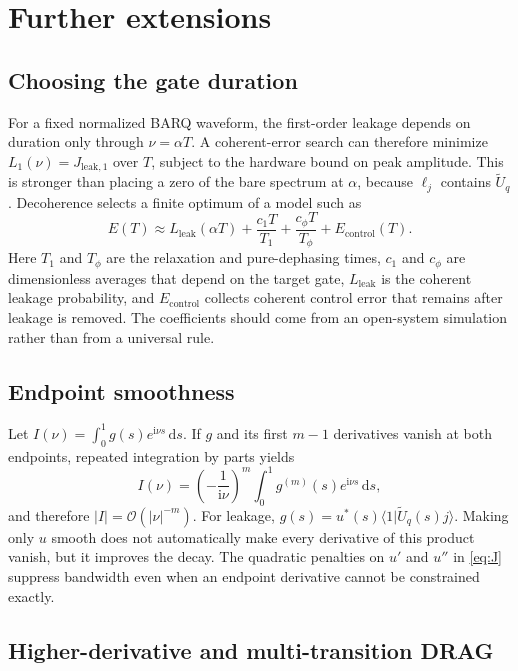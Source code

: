 \documentclass[11pt,a4paper]{article}
\theoremstyle{definition}
\newcommand{\braket}[2]{\langle #1\vert #2\rangle}
\newcommand{\abs}[1]{\lvert #1\rvert}
\newcommand{\dd}{\mathrm{d}}
\newcommand{\ii}{\mathrm{i}}
\newcommand{\order}{\mathcal{O}}
\begin{document}
\section{Further extensions}

\subsection{Choosing the gate duration}

For a fixed normalized BARQ waveform, the first-order leakage depends on
duration only through \(\nu=\alpha T\).  A coherent-error search can therefore
minimize \(L_1(\nu)=J_{\mathrm{leak},1}\) over \(T\), subject to the hardware
bound on peak amplitude.  This is stronger than placing a zero of the bare
spectrum at \(\alpha\), because \(\ell_j\) contains \(\tilde U_q\).  Decoherence
selects a finite optimum of a model such as
\begin{equation}
  E(T)\approx L_{\mathrm{leak}}(\alpha T)+\frac{c_1T}{T_1}+\frac{c_\phi T}{T_\phi}
  +E_{\mathrm{control}}(T).
\end{equation}
Here \(T_1\) and \(T_\phi\) are the relaxation and pure-dephasing times,
\(c_1\) and \(c_\phi\) are dimensionless averages that depend on the target
gate, \(L_{\mathrm{leak}}\) is the coherent leakage probability, and
\(E_{\mathrm{control}}\) collects coherent control error that remains after
leakage is removed.  The coefficients should come from an open-system
simulation rather than from a universal rule.

\subsection{Endpoint smoothness}

Let \(I(\nu)=\int_0^1 g(s)e^{\ii\nu s}\,\dd s\).  If \(g\) and its first
\(m-1\) derivatives vanish at both endpoints, repeated integration by parts
yields
\begin{equation}
  I(\nu)=\left(-\frac1{\ii\nu}\right)^m\int_0^1 g^{(m)}(s)e^{\ii\nu s}\,\dd s,
\end{equation}
and therefore \(\abs I=\order(\abs\nu^{-m})\).  For leakage,
\(g(s)=u^*(s)\braket{1}{\tilde U_q(s)j}\).  Making only \(u\) smooth does not
automatically make every derivative of this product vanish, but it improves the
decay.  The quadratic penalties on \(u'\) and \(u''\) in \eqref{eq:J} suppress
bandwidth even when an endpoint derivative cannot be constrained exactly.

\subsection{Higher-derivative and multi-transition DRAG}
\end{document}
